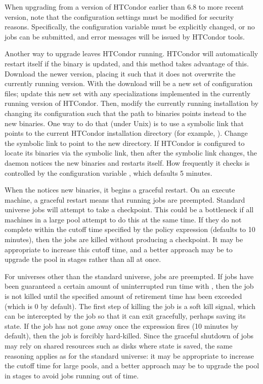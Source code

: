 When upgrading from a version of HTCondor earlier than 6.8 to more recent version,
note that the configuration settings must be modified for security reasons.
Specifically, the  configuration variable
must be explicitly changed,
or no jobs can be submitted,
and error messages will be issued by HTCondor tools.

Another way to upgrade leaves HTCondor running. 
HTCondor will automatically restart itself if the  binary
is updated,
and this method takes advantage of this. 
Download the newer version, placing it such that it does not 
overwrite the currently running version.
With the download will be a new set of configuration files;
update this new set with any specializations implemented in the currently
running version of HTCondor.
Then, modify the currently running installation by changing its
configuration such that the path to binaries points instead
to the new binaries.
One way to do that (under Unix) is to use a symbolic link that points 
to the current HTCondor installation directory (for example, ).
Change the symbolic link to point to the new directory. 
If HTCondor is configured to locate its binaries via the symbolic link, 
then after the symbolic link changes, 
the  daemon notices the new binaries and restarts itself. 
How frequently it checks is controlled by the configuration variable 
, which defaults 5 minutes.

When the  notices new binaries, 
it begins a graceful restart. 
On an execute machine, 
a graceful restart means that running jobs are preempted. 
Standard universe jobs will attempt to take a checkpoint. 
This could be a bottleneck if all machines in a large pool 
attempt to do this at the same time. 
If they do not complete within the cutoff time specified by the  
policy expression (defaults to 10 minutes), 
then the jobs are killed without producing a checkpoint. 
It may be appropriate to increase this cutoff time, 
and a better approach may be to upgrade the pool in stages 
rather than all at once. 

For universes other than the standard universe, jobs are preempted. 
If jobs have been guaranteed a certain amount of uninterrupted run time 
with , 
then the job is not killed until the specified amount of 
retirement time has been exceeded (which is 0 by default). 
The first step of killing the job is a soft kill signal, 
which can be intercepted by the job so that it can exit gracefully, 
perhaps saving its state. 
If the job has not gone away once the  expression fires 
(10 minutes by default), 
then the job is forcibly hard-killed. 
Since the graceful shutdown of jobs may rely on shared resources such as disks 
where state is saved, 
the same reasoning applies as for the standard universe: 
it may be appropriate to increase the cutoff time 
for large pools, 
and a better approach may be to upgrade the pool in stages 
to avoid jobs running out of time. 

